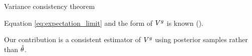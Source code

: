 \begin{frame}[t]{Variance consistency theorem}

\pause
Equation \ref{eq:expectation_limit} and the form of  $V^g$ is known (\citep{kleijn:2012:bvm}).  

Our contribution is a consistent estimator of $V^g$ using posterior samples 
rather than $\hat\theta$.

\end{frame}


